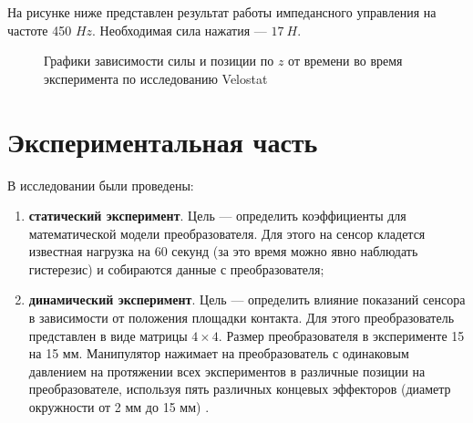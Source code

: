 На рисунке ниже  представлен результат работы импедансного управления на частоте 450 $Hz$. Необходимая сила нажатия --- $17\ H$.
\begin{figure}[h]
        \centering
        \caption{Графики зависимости силы и позиции по $z$ от времени во время эксперимента по исследованию Velostat}
        \label{fig:force_data_pos.png}
    \end{figure}

\section{Экспериментальная часть}

В исследовании были проведены:
\begin{enumerate}
    \item \textbf{статический эксперимент}. Цель — определить коэффициенты для математической модели преобразователя. Для этого на сенсор кладется известная нагрузка на 60 секунд (за это время можно явно наблюдать гистерезис) и собираются данные с преобразователя;
          \item\textbf{динамический эксперимент}. Цель — определить влияние показаний сенсора в зависимости от положения площадки контакта. Для этого преобразователь представлен в виде матрицы $4 \times 4$. Размер преобразователя в эксперименте 15 на 15 мм. Манипулятор нажимает на преобразователь с одинаковым давлением на протяжении всех экспериментов в различные позиции на преобразователе, используя пять различных концевых эффекторов (диаметр окружности от 2 мм до 15 мм) .
\end{enumerate}

